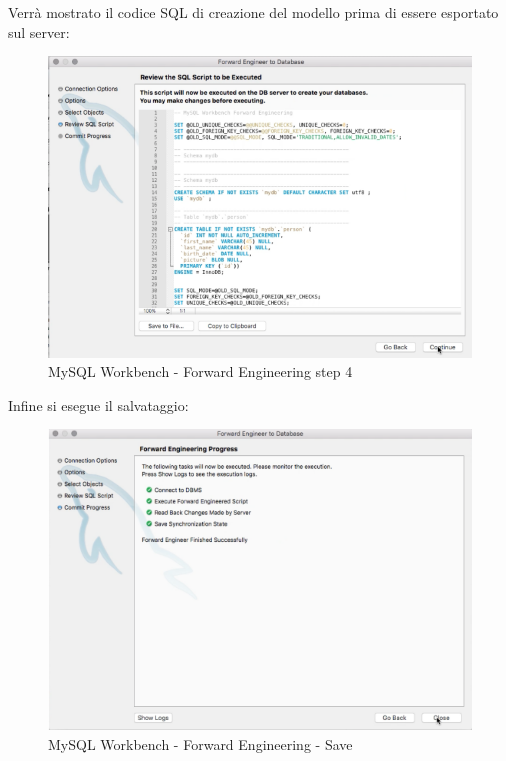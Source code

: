 Verrà mostrato il codice SQL di creazione del modello prima di essere esportato sul server: 

\begin{center}
\begin{figure}[H]
\centering
\includegraphics[scale=0.8]{figures/mySQL_workbench_FE4.png}
\caption{MySQL Workbench - Forward Engineering step 4}
\end{figure}
\end{center}

Infine si esegue il salvataggio:

\begin{center}
\begin{figure}[H]
\centering
\includegraphics[scale=1]{figures/mySQL_workbench_FEfinal.png}
\caption{MySQL Workbench - Forward Engineering - Save}
\end{figure}
\end{center}

